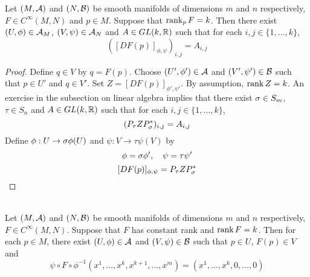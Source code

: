 \documentclass{book}
\begin{document}
	\begin{ex}
		Let $(M, \mathcal{A})$ and $(N, \mathcal{B})$ be smooth manifolds of dimensions $m$ and $n$ respectively, $F \in C^{\infty}(M,N)$ and $p \in M$. Suppose that $\operatorname{\text{rank}}_p F = k$. Then there exist $(U, \phi) \in \mathcal{A}_M$, $(V, \psi) \in \mathcal{A}_N$ and $A \in GL(k, \mathbb{R})$ such that for each $i,j \in \{1, \ldots, k\}$, 
		$$([DF(p)]_{\phi, \psi})_{i,j} = A_{i,j} $$
	\end{ex}
	
	\begin{proof}
		Define $q \in V$ by $q = F(p)$. Choose $(U', \phi') \in \mathcal{A}$ and $(V', \psi') \in \mathcal{B}$ such that $p \in U'$ and $q \in V'$. Set $Z = [DF(p)]_{\phi', \psi'}$. By assumption, $\operatorname{\text{rank}} Z = k$. An exercise in the subsection on linear algebra implies that there exist $\sigma \in S_{m}$, $\tau \in S_{n}$ and $A \in GL(k, \mathbb{R})$ such that for each $i,j \in \{1, \ldots, k\}$, 
		$$(P_{\tau} Z P_{\sigma}^*)_{i, j} = A_{i,j}$$
		Define $\phi: U \rightarrow \sigma \phi(U)$ and $\psi: V \rightarrow \tau \psi(V)$ by 
		$$\phi = \sigma \phi', \quad \psi = \tau \psi'$$
		$$[DF(p)]_{\phi, \psi} = P_{\tau} Z P_{\sigma}^*$$
	\end{proof}
	
	\begin{ex}  \\
			Let $(M, \mathcal{A})$ and $(N, \mathcal{B})$ be smooth manifolds of dimensions $m$ and $n$ respectively, $F \in C^{\infty}(M,N)$. Suppose that $F$ has constant rank and $\operatorname{\text{rank}} F = k$. Then for each $p \in M$, there exist $(U, \phi) \in \mathcal{A}$ and $(V, \psi) \in \mathcal{B}$ such that $p \in U$, $F(p) \in V$ and
			$$\psi \circ F \circ \phi^{-1}(x^1, \ldots, x^k, x^{k+1}, \ldots, x^m) = (x^1, \ldots, x^k, 0, \ldots, 0)$$ 
			 
	\end{ex}
	
\end{document}
